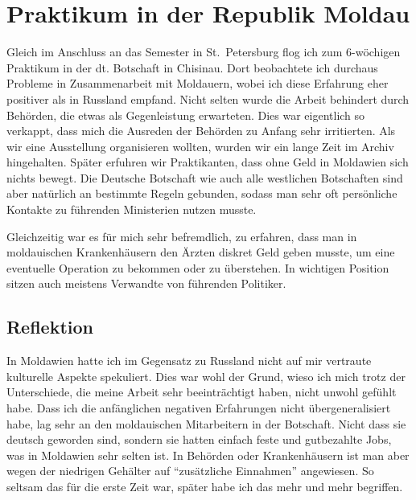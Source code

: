 \documentclass{../../sem_paper}
\begin{document}
\section{Praktikum in der Republik Moldau}

Gleich im Anschluss an das Semester in St.\ Petersburg flog ich zum 6-wöchigen Praktikum in der dt. Botschaft in Chisinau. Dort beobachtete ich durchaus Probleme in Zusammenarbeit mit Moldauern, wobei ich diese Erfahrung eher positiver als in Russland empfand. Nicht selten wurde die Arbeit behindert durch Behörden, die etwas als Gegenleistung erwarteten. Dies war eigentlich so verkappt, dass mich die Ausreden der Behörden zu Anfang sehr irritierten. Als wir eine Ausstellung organisieren wollten, wurden wir ein lange Zeit im Archiv hingehalten. Später erfuhren wir Praktikanten, dass ohne Geld in Moldawien sich nichts bewegt. Die Deutsche Botschaft wie auch alle westlichen Botschaften sind aber natürlich an bestimmte Regeln gebunden, sodass man sehr oft persönliche Kontakte zu führenden Ministerien nutzen musste.

Gleichzeitig war es für mich sehr befremdlich, zu erfahren, dass man in moldauischen Krankenhäusern den Ärzten diskret Geld geben musste, um eine eventuelle Operation zu bekommen oder zu überstehen. In wichtigen Position sitzen auch meistens Verwandte von führenden Politiker.
\subsection*{Reflektion}

In Moldawien hatte ich im Gegensatz zu Russland nicht auf mir vertraute kulturelle Aspekte spekuliert. Dies war wohl der Grund, wieso ich mich trotz der Unterschiede, die meine Arbeit sehr beeinträchtigt haben, nicht unwohl gefühlt habe. Dass ich die anfänglichen negativen Erfahrungen nicht übergeneralisiert habe, lag sehr an den moldauischen Mitarbeitern in der Botschaft. Nicht dass sie deutsch geworden sind, sondern sie hatten einfach feste und gutbezahlte Jobs, was in Moldawien sehr selten ist. In Behörden oder Krankenhäusern ist man aber wegen der niedrigen Gehälter auf “zusätzliche Einnahmen” angewiesen. So seltsam das für die erste Zeit war, später habe ich das mehr und mehr begriffen.

\end{document}
